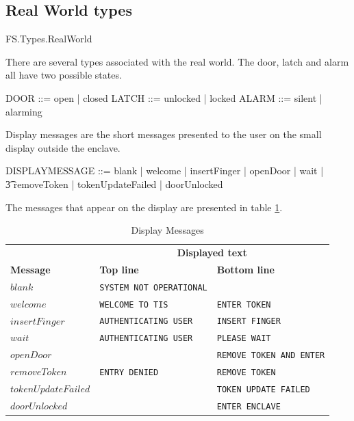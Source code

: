 \subsection{Real World types}

\begin{traceunit}{FS.Types.RealWorld}
\end{traceunit}


There are several types associated with the real world. The door,
latch and alarm all have two possible states.
\begin{zed}
	DOOR ::= open | closed
\also
	LATCH ::= unlocked | locked
\also
	ALARM ::= silent | alarming
\end{zed}

Display messages are the short messages presented to the user on the
small display outside the enclave.
\begin{zed}
	DISPLAYMESSAGE ::= blank | welcome | insertFinger | openDoor |
                        wait | 
\\      \t3  removeToken | tokenUpdateFailed | doorUnlocked
\end{zed}

The messages that appear on the display are presented in table \ref{table:display}.

\begin{table}[h]
\begin{tabular}{|l|l|l|}
                & \multicolumn{2}{c|}{\bf Displayed text} \\ \cline{2-3}
{\bf Message}   & {\bf Top line}                & {\bf Bottom line}     \\
\hline
$blank$         & {\tt SYSTEM NOT OPERATIONAL}  & \\
$welcome$       & {\tt WELCOME TO TIS}          & {\tt ENTER TOKEN}  \\
$insertFinger$  & {\tt AUTHENTICATING USER}     & {\tt INSERT FINGER} \\ 
$wait$          & {\tt AUTHENTICATING USER}     & {\tt PLEASE WAIT} \\
$openDoor$      & {\tt }                        & {\tt REMOVE TOKEN AND ENTER} \\
$removeToken$   & {\tt ENTRY DENIED}            & {\tt REMOVE TOKEN} \\
$tokenUpdateFailed$ &                   & {\tt TOKEN UPDATE FAILED }
\\
$doorUnlocked$  &                       & {\tt ENTER ENCLAVE} \\
\hline
\end{tabular}
\caption{Display Messages}
\label{table:display}
\end{table}


